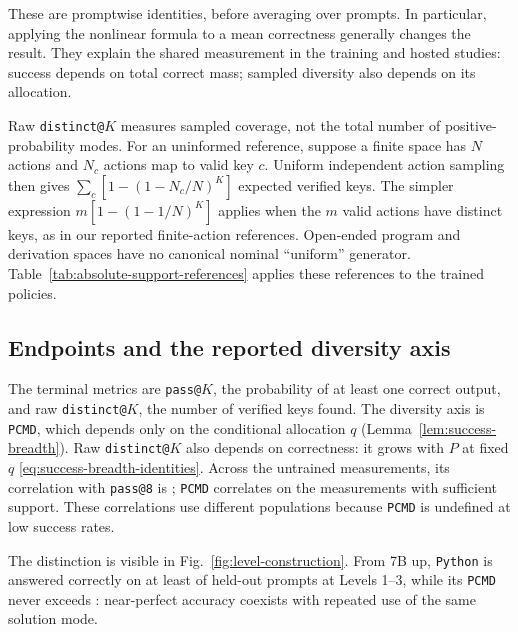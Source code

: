 \documentclass{article}
\newcommand{\1}{\mathbf 1}
\newcommand{\pmd}{\texttt{PCMD}}
\theoremstyle{remark}
\theoremstyle{definition}
\theoremstyle{plain}
\begin{document}
These are promptwise identities, before averaging over prompts. In particular,
applying the nonlinear formula to a mean correctness generally changes the
result. They explain the shared measurement in the training and hosted
studies: success depends on total correct mass; sampled diversity also depends
on its allocation.

Raw \texttt{distinct@}$K$ measures sampled coverage, not the total number of
positive-probability modes. For an uninformed reference, suppose a finite
space has $N$ actions and $N_c$ actions map to valid key $c$. Uniform
independent action sampling then gives $\sum_c[1-(1-N_c/N)^K]$ expected
verified keys. The simpler expression $m[1-(1-1/N)^K]$ applies when the $m$
valid actions have distinct keys, as in our reported finite-action references.
Open-ended program and derivation spaces have no canonical nominal
``uniform'' generator. Table~\ref{tab:absolute-support-references} applies these
references to the trained policies.

\subsection{Endpoints and the reported diversity axis}
\label{app:reported-endpoints}

The terminal metrics are \texttt{pass@}$K$, the probability of at least one
correct output, and raw \texttt{distinct@}$K$, the number of verified keys
found. The diversity axis is \pmd{}, which depends only on the conditional
allocation $q$ (Lemma~\ref{lem:success-breadth}). Raw \texttt{distinct@}$K$
also depends on correctness: it grows with $P$ at fixed $q$
\eqref{eq:success-breadth-identities}. Across the \MDcells{} untrained
measurements, its correlation with \texttt{pass@8} is \MDdistinctcorr{};
\pmd{} correlates \MDpmdcorr{} on the \MDreportable{} measurements with
sufficient support. These correlations use different populations because
\pmd{} is undefined at low success rates.

The distinction is visible in Fig.~\ref{fig:level-construction}. From 7B up,
\texttt{Python} is answered correctly on at least \MDpyPasslo{} of held-out prompts
at Levels 1--3, while its \pmd{} never exceeds \MDpyPmdhi{}: near-perfect
accuracy coexists with repeated use of the same solution mode.
\end{document}
